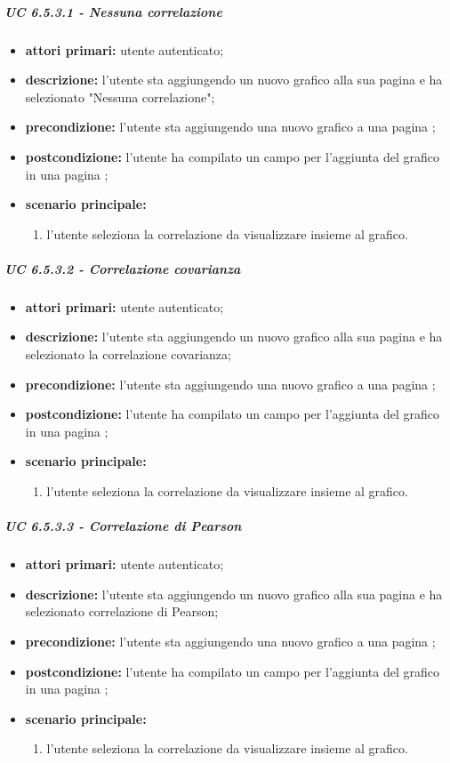 			\subparagraph{UC 6.5.3.1 - Nessuna correlazione}
			\begin{itemize}
				\item \textbf{attori primari:} utente autenticato;
				\item \textbf{descrizione:} l'utente sta aggiungendo un nuovo grafico alla sua pagina  e ha selezionato "Nessuna correlazione";
				\item \textbf{precondizione:} l'utente sta aggiungendo una nuovo grafico a una pagina ;
				\item \textbf{postcondizione:} l'utente ha compilato un campo per l'aggiunta del grafico in una pagina ;
				\item \textbf{scenario principale:}
				\begin{enumerate}
					\item{l'utente seleziona la correlazione da visualizzare insieme al grafico.}
				\end{enumerate}
			\end{itemize}

			\subparagraph{UC 6.5.3.2 - Correlazione covarianza}
			\begin{itemize}
				\item \textbf{attori primari:} utente autenticato;
				\item \textbf{descrizione:} l'utente sta aggiungendo un nuovo grafico alla sua pagina  e ha selezionato la correlazione covarianza;
				\item \textbf{precondizione:} l'utente sta aggiungendo una nuovo grafico a una pagina ;
				\item \textbf{postcondizione:} l'utente ha compilato un campo per l'aggiunta del grafico in una pagina ;
				\item \textbf{scenario principale:}
				\begin{enumerate}
					\item{l'utente seleziona la correlazione da visualizzare insieme al grafico.}
				\end{enumerate}
			\end{itemize}

			\subparagraph{UC 6.5.3.3 - Correlazione di Pearson}
			\begin{itemize}
				\item \textbf{attori primari:} utente autenticato;
				\item \textbf{descrizione:} l'utente sta aggiungendo un nuovo grafico alla sua pagina  e ha selezionato correlazione di Pearson;
				\item \textbf{precondizione:} l'utente sta aggiungendo una nuovo grafico a una pagina ;
				\item \textbf{postcondizione:} l'utente ha compilato un campo per l'aggiunta del grafico in una pagina ;
				\item \textbf{scenario principale:}
				\begin{enumerate}
					\item{l'utente seleziona la correlazione da visualizzare insieme al grafico.}
				\end{enumerate}
			\end{itemize}

